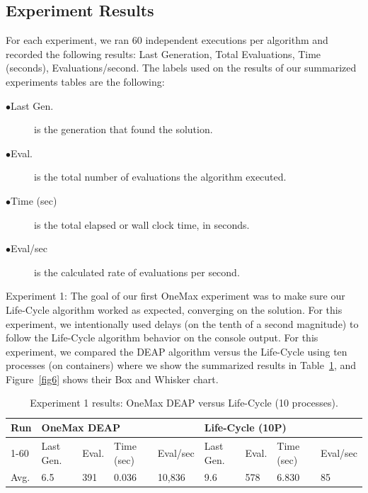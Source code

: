 \documentclass[runningheads]{llncs}
\begin{document}
\subsection{Experiment Results}

For each experiment, we ran 60 independent executions per algorithm and
recorded the following results: Last Generation, Total Evaluations, Time
(seconds), Evaluations/second. The labels used on the results of our summarized
experiments tables are the following:

\begin{description}  %
    \item[$\bullet $Last Gen.] is the generation that found the solution.
    \item[$\bullet $Eval.] is the total number of evaluations the algorithm executed. 
    \item[$\bullet $Time (sec)] is the total elapsed or wall clock time, in seconds. 
    \item[$\bullet $Eval/sec] is the calculated rate of evaluations per second.
\end{description}


Experiment 1: The goal of our first OneMax experiment was to make sure our
Life-Cycle algorithm worked as expected, converging on the solution. For this
experiment, we intentionally used delays (on the tenth of a second magnitude)
to follow the Life-Cycle algorithm behavior on the console output. For this
experiment, we compared the DEAP algorithm versus the Life-Cycle using ten
processes (on containers) where we show the summarized results in Table~\ref{tab2}, and
Figure~\ref{fig6} shows their Box and Whisker chart.

\begin{table}[]
    \centering        
    \caption{Experiment 1 results: OneMax DEAP versus Life-Cycle (10 processes).}\label{tab2}
    \begin{tabular}{|l|l|l|l|l|l|l|l|l|}
    \hline
    Run & \multicolumn{4}{l|}{OneMax DEAP} & \multicolumn{4}{l|}{Life-Cycle (10P)} \\ \hline
    1-60 & Last Gen. & Eval. & Time (sec) & Eval/sec & Last Gen. & Eval. & Time (sec) & Eval/sec \\ \hline
    Avg. & 6.5 & 391 & 0.036 & 10,836 & 9.6 & 578 & 6.830 & 85 \\ \hline
    \end{tabular}
    \end{table}
\end{document}

